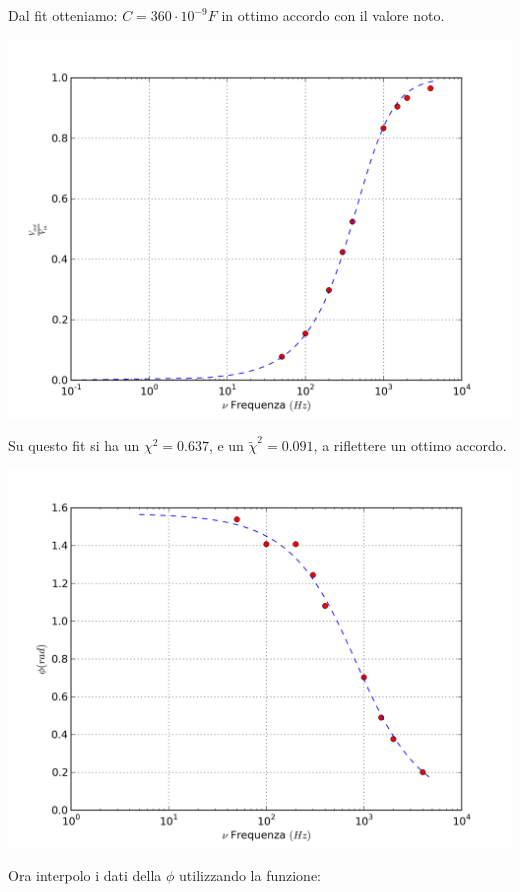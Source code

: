 Dal fit otteniamo: $C=360 \cdot 10^{-9} F $ in ottimo accordo con il valore noto.

\begin{center}
 \includegraphics[scale=0.70]{grafici/C3/ddpcond.png}
\end{center}

Su questo fit si ha un $\chi^2=0.637$, e un $\tilde{\chi}^2 = 0.091$, a riflettere un ottimo accordo.

\begin{center}
 \includegraphics[scale=0.70]{grafici/C3/fasecap.png}
\end{center}

Ora interpolo i dati della $ \phi$ utilizzando la funzione:

